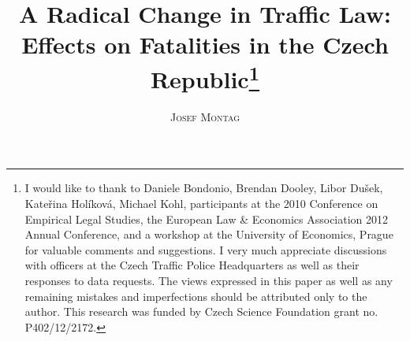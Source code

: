 \documentclass[12pt]{article}
\makeatletter
\renewcommand{\maketitle}{\bgroup\setlength{\parindent}{0pt}
\begin{flushleft}
  {\LARGE \@title}

  {\large \@author}
\end{flushleft}\egroup
}
\makeatother
\begin{document}
\title{A Radical Change in Traffic Law: \\Effects on Fatalities in the Czech
  Republic\thanks{I would like to thank to Daniele Bondonio, Brendan Dooley,
    Libor Dušek, Kateřina Holíková, Michael Kohl, participants at the 2010
    Conference on Empirical Legal Studies, the European Law \& Economics
    Association 2012 Annual Conference, and a workshop at the University of
    Economics, Prague for valuable comments and suggestions. I very much
    appreciate discussions with officers at the Czech Traffic Police
    Headquarters as well as their responses to data requests. The views
    expressed in this paper as well as any remaining mistakes and imperfections
    should be attributed only to the author.  This research was funded by Czech
    Science Foundation grant no. P402/12/2172.
  }
}

\author{\textsc{Josef Montag}}



\date{}




\maketitle
\end{document}
